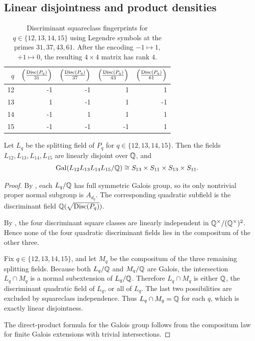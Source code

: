 \subsection{Linear disjointness and product densities}

\begin{table}[t]
\centering
\scriptsize
\setlength{\tabcolsep}{6pt}
\caption{Discriminant squareclass fingerprints for \(q\in\{12,13,14,15\}\)
using Legendre symbols at the primes \(31,37,43,61\).  After the encoding
\(-1\mapsto 1\), \(+1\mapsto 0\), the resulting \(4\times 4\) matrix has rank
\(4\).}
\label{tab:disc-squareclass-q12-15}
\begin{tabular}{r r r r r}
\toprule
\(q\) & \(\left(\frac{\operatorname{Disc}(P_q)}{31}\right)\) &
\(\left(\frac{\operatorname{Disc}(P_q)}{37}\right)\) &
\(\left(\frac{\operatorname{Disc}(P_q)}{43}\right)\) &
\(\left(\frac{\operatorname{Disc}(P_q)}{61}\right)\) \\
\midrule
12 & -1 & -1 & 1 & 1 \\
13 & 1 & -1 & 1 & -1 \\
14 & -1 & 1 & 1 & 1 \\
15 & -1 & -1 & -1 & 1 \\
\bottomrule
\end{tabular}
\end{table}

\begin{theorem}[Linear disjointness for \texorpdfstring{$q=12,13,14,15$}{q=12,13,14,15}]
\label{thm:linear-disjointness}
Let \(L_q\) be the splitting field of \(P_q\) for
\(q\in\{12,13,14,15\}\).  Then the fields \(L_{12},L_{13},L_{14},L_{15}\) are
linearly disjoint over \(\mathbb{Q}\), and
\[
  \operatorname{Gal}(L_{12}L_{13}L_{14}L_{15}/\mathbb{Q})
  \cong
  S_{13}\times S_{11}\times S_{13}\times S_{11}.
\]
\end{theorem}

\begin{proof}
By , each \(L_q/\mathbb{Q}\) has full symmetric Galois
group, so its only nontrivial proper normal subgroup is \(A_{d_q}\).  The
corresponding quadratic subfield is the discriminant field
\(\mathbb{Q}(\sqrt{\operatorname{Disc}(P_q)})\).

By , the four discriminant square classes are
linearly independent in \(\mathbb{Q}^\times/(\mathbb{Q}^\times)^2\).  Hence none of the four
quadratic discriminant fields lies in the compositum of the other three.

Fix \(q\in\{12,13,14,15\}\), and let \(M_q\) be the compositum of the three
remaining splitting fields.  Because both \(L_q/\mathbb{Q}\) and \(M_q/\mathbb{Q}\) are
Galois, the intersection \(L_q\cap M_q\) is a normal subextension of
\(L_q/\mathbb{Q}\).  Therefore \(L_q\cap M_q\) is either \(\mathbb{Q}\), the discriminant
quadratic field of \(L_q\), or all of \(L_q\).  The last two possibilities are
excluded by squareclass independence.  Thus \(L_q\cap M_q=\mathbb{Q}\) for each \(q\),
which is exactly linear disjointness.

The direct-product formula for the Galois group follows from the compositum law
for finite Galois extensions with trivial intersections.
\end{proof}

